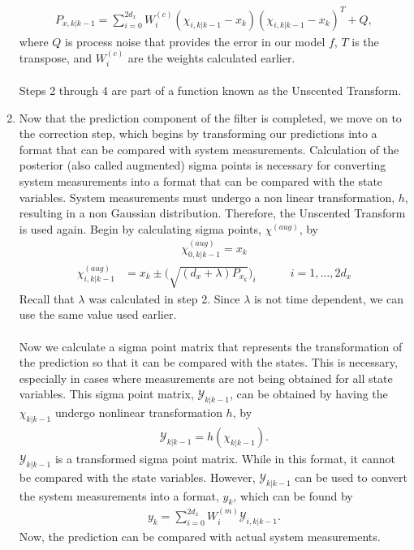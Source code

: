 \begin{enumerate}
        \begin{align*}
        P_{x, k | k-1} = \sum^{2d_x}_{i = 0} W_i^{(c)} (\chi_{i, k | k - 1} -   x_{k} )(\chi_{i, k | k - 1} - x_{k} )^T + Q,
        \end{align*} 
        where $Q$ is process noise that provides the error in our model $f$, $T$ is the transpose, and $W_i^{(c)}$ are the weights calculated earlier. \\ \\
        Steps 2 through 4 are part of a function known as the Unscented Transform.
        
        
                \item Now that the prediction component of the filter is completed, we move on to the correction step, which begins by transforming our predictions into a format that can be compared with system measurements. Calculation of the posterior (also called augmented) sigma points is necessary for converting system measurements into a format that can be compared with the state variables. System measurements must undergo a non linear transformation, $h$, resulting in a non Gaussian distribution. Therefore, the Unscented Transform is used again. Begin by calculating sigma points, $\chi^{(aug)}$, by
      \begin{align*}
        \chi^{(aug)}_{0, k|k-1} =  x_{k}
        \end{align*}
         \begin{align*}
        \chi^{(aug)}_{ i,k |k-1} &= x_k  \pm \bigg(\sqrt{(d_{x}+\lambda)P_{x_k}} \bigg)_{i} \quad \quad \quad  i=1,\dots,2d_{x}
        \end{align*}
        Recall that $\lambda$ was calculated in step 2. Since $\lambda$ is not time dependent, we can use the same value used earlier. \\ \\
        Now we calculate a sigma point matrix that represents the transformation of the prediction so that it can be compared with the states. This is necessary, especially in cases where measurements are not being obtained for all state variables. This sigma point matrix, $\mathcal{Y}_{k|k-1}$, can be obtained by having the $\chi_{k|k-1}$ undergo nonlinear transformation $h$, by
         \begin{align*}
       \mathcal{Y}_{k|k-1} = h(\chi_{k|k-1}).
       \end{align*}
       $\mathcal{Y}_{k|k-1} $ is a transformed sigma point matrix. While in this format, it cannot be compared with the state variables. However, $\mathcal{Y}_{k|k-1}$ can be used to convert the system measurements into a format, $y_{k} $, which can be found by 
       \begin{align*}
       y_{k} = \sum^{2d_x}_{i = 0} W_i^{(m)}  \mathcal{Y}_{i, k | k - 1}.
       \end{align*}
       Now, the prediction can be compared with actual system measurements.
       

\end{enumerate}
